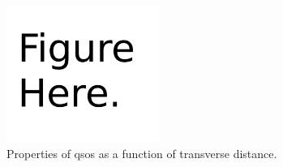 \begin{figure}
 \begin{minipage}{0.5\textwidth}
    \centering
    \includegraphics[width=5cm]{figs/figure_sample.pdf}
  \end{minipage}

\caption{Properties of \acp{qso} as a function of transverse distance.}
\label{fig:fig_appendix}

\end{figure}
